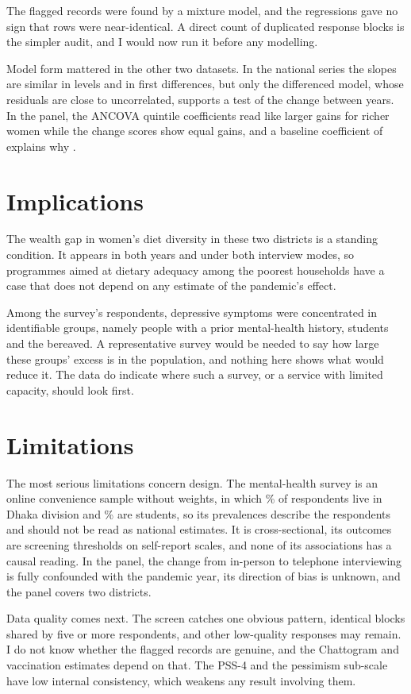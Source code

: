 The flagged records were found by a mixture model, and the regressions gave no sign that \SuspectN{} rows were near-identical. A direct count of duplicated response blocks is the simpler audit, and I would now run it before any modelling.

Model form mattered in the other two datasets. In the national series the slopes are similar in levels and in first differences, but only the differenced model, whose residuals are close to uncorrelated, supports a test of the change between years. In the panel, the ANCOVA quintile coefficients read like larger gains for richer women while the change scores show equal gains, and a baseline coefficient of \PanBaseb{} explains why \parencite{lord1967}.

\section{Implications}
The wealth gap in women's diet diversity in these two districts is a standing condition. It appears in both years and under both interview modes, so programmes aimed at dietary adequacy among the poorest households have a case that does not depend on any estimate of the pandemic's effect.

Among the survey's respondents, depressive symptoms were concentrated in identifiable groups, namely people with a prior mental-health history, students and the bereaved. A representative survey would be needed to say how large these groups' excess is in the population, and nothing here shows what would reduce it. The data do indicate where such a survey, or a service with limited capacity, should look first.

\section{Limitations}
The most serious limitations concern design. The mental-health survey is an online convenience sample without weights, in which \MhDhaka\% of respondents live in Dhaka division and \MhStudents\% are students, so its prevalences describe the respondents and should not be read as national estimates. It is cross-sectional, its outcomes are screening thresholds on self-report scales, and none of its associations has a causal reading. In the panel, the change from in-person to telephone interviewing is fully confounded with the pandemic year, its direction of bias is unknown, and the panel covers two districts.

Data quality comes next. The screen catches one obvious pattern, identical blocks shared by five or more respondents, and other low-quality responses may remain. I do not know whether the flagged records are genuine, and the Chattogram and vaccination estimates depend on that. The PSS-4 and the pessimism sub-scale have low internal consistency, which weakens any result involving them.

